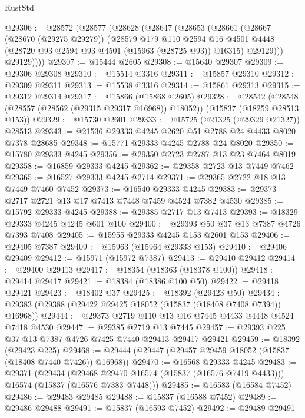 \begin{lexlean}{RustStd}
\begin{coremodule}
@29306 := @28572
    (@28577
      (@28628
        (@28647
          (@28653
            (@28661
              (@28667
                (@28670 (@29275 @29279))
                (@28579
                  @179
                  @110
                  @2594
                  @16
                  @4501
                  @4448
                  (@28720 @93 @2594 @93 @4501 (@15963 (@28725 @93)) @16315)
                  @29129)))
            @29129))))
@29307 := @15444 @2605
@29308 := @15640 @29307
@29309 := @29306 @29308
@29310 := @15514 @3316
@29311 := @15857 @29310
@29312 := @29309 @29311
@29313 := @15538 @3316
@29314 := @15861 @29313
@29315 := @29312 @29314
@29317 := @15866 (@15868 @2605)
@29328 := @28542
    (@28548 (@28557 (@28562 (@29315 @29317 @16968)) @18052))
    (@15837 (@18259 @28513 @153))
@29329 := @15730 @2601
@29333 := @15725 (@21325 (@29329 @21327)) @28513
@29343 := @21536 @29333 @4245 @2620 @51 @2788 @24 @4433 @8020 @7378 @28685
@29348 := @15771 @29333 @4245 @2788 @24 @8020
@29350 := @15780 @29333 @4245
@29356 := @29350 @2723 @2787 @13 @23 @7464 @8019
@29358 := @16859 @29333 @4245
@29362 := @29358 @2723 @13 @7449 @7462
@29365 := @16527 @29333 @4245 @2714
@29371 := @29365 @2722 @18 @13 @7449 @7460 @7452
@29373 := @16540 @29333 @4245
@29383 := @29373 @2717 @2721 @13 @17 @7413 @7448 @7459 @4524 @7382 @4530
@29385 := @15792 @29333 @4245
@29388 := @29385 @2717 @13 @7413
@29393 := @18329 @29333 @4245 @4245 @601 @100
@29400 := @29393 @50 @37 @13 @7387 @4726 @7393 @7408
@29405 := @15955 @29333 @4245 @153 @2601 @153
@29406 := @29405 @7387
@29409 := @15963 (@15964 @29333 @153)
@29410 := @29406 @29409
@29412 := @15971 (@15972 @7387)
@29413 := @29410 @29412
@29414 := @29400 @29413
@29417 := @18354 (@18363 (@18378 @100))
@29418 := @29414 @29417
@29421 := @18384 (@18386 @100 @50)
@29422 := @29418 @29421
@29423 := @18402 @37
@29425 := @18392 (@29423 @50)
@29434 := @29383 (@29388 (@29422 @29425 @18052 (@15837 (@18408 @7408 @7394)) @16968))
@29444 := @29373 @2719 @110 @13 @16 @7445 @4433 @4448 @4524 @7418 @4530
@29447 := @29385 @2719 @13 @7445
@29457 := @29393 @225 @37 @13 @7387 @4726 @7425 @7440 @29413 @29417 @29421
@29459 := @18392 (@29423 @225)
@29468 := @29444 (@29447 (@29457 @29459 @18052 (@15837 (@18408 @7440 @7426)) @16968))
@29470 := @16568 @29333 @4245
@29483 := @29371
    (@29434
      (@29468 @29470 @16574 (@15837 (@16576 @7419 @4433)))
      @16574
      (@15837 (@16576 @7383 @7448)))
@29485 := @16583 (@16584 @7452)
@29486 := @29483 @29485
@29488 := @15837 (@16588 @7452)
@29489 := @29486 @29488
@29491 := @15837 (@16593 @7452)
@29492 := @29489 @29491

\end{coremodule}
\end{lexlean}
